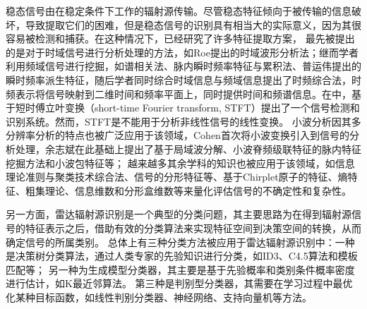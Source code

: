 稳态信号由在稳定条件下工作的辐射源传输。尽管稳态特征倾向于被传输的信息破坏，导致提取它们的困难，但是稳态信号的识别具有相当大的实际意义，因为其很容易被检测和捕获。在这种情况下，已经研究了许多特征提取方案，
最先被提出的是对于时域信号进行分析处理的方法，如Roe提出的时域波形分析法；继而学者利用频域信号进行挖掘，如谱相关法、脉内瞬时频率特征与累积法、普运伟提出的瞬时频率派生特征，随后学者同时综合时域信息与频域信息提出了时频综合法，时频表示将信号映射到二维时间和频率平面上，同时提供时间和频谱信息。在\cite{lopez2005digital}中，基于短时傅立叶变换（short-time Fourier transform, STFT）提出了一个信号检测和识别系统。然而，STFT是不能用于分析非线性信号的线性变换。
小波分析因其多分辨率分析的特点也被广泛应用于该领域，Cohen首次将小波变换引入到信号的分析处理，余志斌在此基础上提出了基于局域波分解、小波脊频级联特征的脉内特征挖掘方法和小波包特征等；
越来越多其余学科的知识也被应用于该领域，如信息理论准则与聚类技术综合法、信号的分形特征等、基于Chirplet原子的特征、熵特征、粗集理论、信息维数和分形盒维数等来量化评估信号的不确定性和复杂性。

另一方面，雷达辐射源识别是一个典型的分类问题，其主要思路为在得到辐射源信号的特征表示之后，借助有效的分类算法来实现特征空间到决策空间的转换，从而确定信号的所属类别。
总体上有三种分类方法被应用于雷达辐射源识别中：一种是决策树分类算法，通过人类专家的先验知识进行分类，如ID3、C4.5算法和模板匹配等；
另一种为生成模型分类器，其主要是基于先验概率和类别条件概率密度进行估计，如K最近邻算法。
第三种是判别型分类器，其需要在学习过程中最优化某种目标函数，如线性判别分类器、神经网络、支持向量机等方法。

